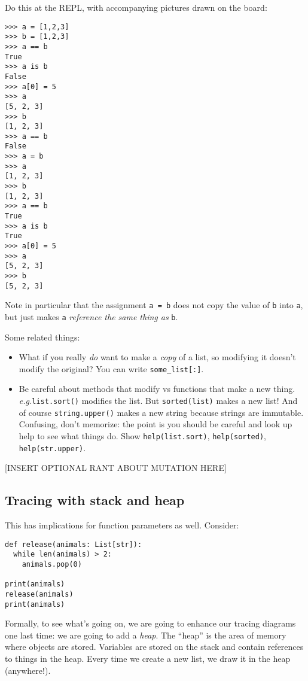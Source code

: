 \documentclass{article}
\newcommand{\eg}{\emph{e.g.}\xspace}
\begin{document}
Do this at the REPL, with accompanying pictures drawn on the board:
\begin{verbatim}
>>> a = [1,2,3]
>>> b = [1,2,3]
>>> a == b
True
>>> a is b
False
>>> a[0] = 5
>>> a
[5, 2, 3]
>>> b
[1, 2, 3]
>>> a == b
False
>>> a = b
>>> a
[1, 2, 3]
>>> b
[1, 2, 3]
>>> a == b
True
>>> a is b
True
>>> a[0] = 5
>>> a
[5, 2, 3]
>>> b
[5, 2, 3]
\end{verbatim}
Note in particular that the assignment \verb|a = b| does not copy the
value of \verb|b| into \verb|a|, but just makes \verb|a|
\emph{reference the same thing as} \verb|b|.

Some related things:
\begin{itemize}
\item What if you really \emph{do} want to make a \emph{copy} of a
  list, so modifying it doesn't modify the original?  You can write
  \verb|some_list[:]|.
\item Be careful about methods that modify vs functions that make a
  new thing.  \eg \verb|list.sort()| modifies the list.  But
  \verb|sorted(list)| makes a new list!  And of course
  \verb|string.upper()| makes a new string because strings are
  immutable.  Confusing, don't memorize: the point is you should be
  careful and look up help to see what things do.  Show
  \verb|help(list.sort)|, \verb|help(sorted)|, \verb|help(str.upper)|.
\end{itemize}

[INSERT OPTIONAL RANT ABOUT MUTATION HERE]

\subsection*{Tracing with stack and heap}

This has implications for function parameters as well.  Consider:

\begin{verbatim}
def release(animals: List[str]):
  while len(animals) > 2:
    animals.pop(0)

print(animals)
release(animals)
print(animals)
\end{verbatim}

Formally, to see what's going on, we are going to enhance our tracing
diagrams one last time: we are going to add a \emph{heap}.  The
``heap'' is the area of memory where objects are stored. Variables are
stored on the stack and contain references to things in the heap.
Every time we create a new list, we draw it in the heap (anywhere!).
\end{document}
